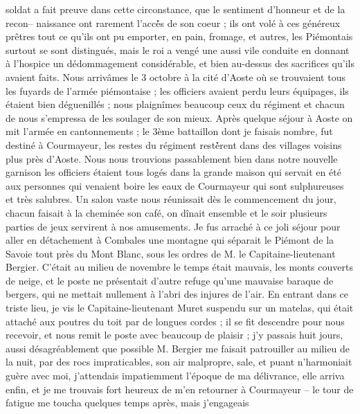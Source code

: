 \documentclass[12pt]{article}
\begin{document}
 soldat a fait preuve dans cette circonstance, que le
sentiment d’honneur et de la recon– naissance ont rarement l’accè́s de son coeur ; ils ont volé à
ces généreux prêtres tout ce qu’ils ont pu emporter, en pain, fromage, et autres, les Piémontais
surtout se sont distingués, mais le roi a vengé une aussi vile conduite en donnant à l’hospice un
dédommagement considérable, et bien au-dessus des sacrifices qu’ils avaient faits. Nous arrivâmes le
3 octobre à la cité d’Aoste où se trouvaient tous les fuyards de l’armée piémontaise ; les officiers
avaient perdu leurs équipages, ils étaient bien déguenillés ; nous plaignîmes beaucoup ceux du
régiment et chacun de nous s’empressa de les soulager de son mieux. Après quelque séjour à Aoste on
mit l’armée en cantonnements ; le 3ème battaillon dont je faisais nombre, fut destiné à Courmayeur,
les restes du régiment restè́rent dans des villages voisins plus près d’Aoste. Nous nous trouvions
passablement bien dans notre nouvelle garnison les officiers étaient tous logés dans la grande
maison qui servait en été aux personnes qui venaient boire les eaux de Courmayeur qui sont
sulphureuses et très salubres. Un salon vaste nous réunissait dès le commencement du jour, chacun
faisait à la cheminée son café, on dînait ensemble et le soir plusieurs parties de jeux servirent à
nos amusements. Je fus arraché à ce joli séjour pour aller en détachement à Combales une montagne
qui séparait le Piémont de la Savoie tout près du Mont Blanc, sous les ordres de M. le
Capitaine-lieutenant Bergier. C’était au milieu de novembre le temps était mauvais, les monts
couverts de neige, et le poste ne présentait d’autre refuge qu’une mauvaise baraque de bergers, qui
ne mettait nullement à l’abri des injures de l’air. En entrant dans ce triste lieu, je vis le
Capitaine-lieutenant Muret suspendu sur un matelas, qui était attaché aux poutres du toit par de
longues cordes ; il se fit descendre pour nous recevoir, et nous remit le poste avec beaucoup de
plaisir ; j’y passais huit jours, aussi désagréablement que possible M. Bergier me faisait
patrouiller au milieu de la nuit, par des rocs impraticables, son air malpropre, sale, et puant
n’harmoniait guère avec moi, j’attendais impatiemment l’époque de ma délivrance, elle arriva enfin,
et je me trouvais fort heureux de m’en retourner à Courmayeur – le tour de fatigue me toucha
quelques temps après, mais j’engageais
\end{document}
